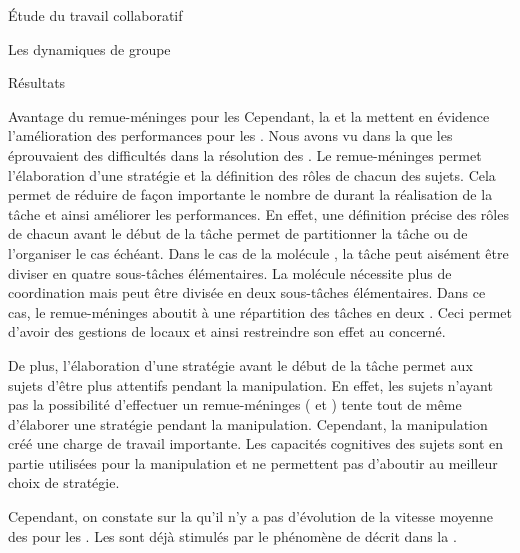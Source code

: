 \documentclass[myfrancais]{mythesis}
\begin{document}
\begin{mypart}{Étude du travail collaboratif}
\begin{mychapter}{Les dynamiques de groupe}
\begin{mysection}{Résultats}
\begin{mysubsection}{Avantage du remue-méninges pour les }
					Cependant, la  et la  mettent en évidence l'amélioration des performances pour les .
					Nous avons vu dans la  que les  éprouvaient des difficultés dans la résolution des .
					Le remue-méninges permet l'élaboration d'une stratégie et la définition des rôles de chacun des sujets.
					Cela permet de réduire de façon importante le nombre de  durant la réalisation de la tâche et ainsi améliorer les performances.
					En effet, une définition précise des rôles de chacun avant le début de la tâche permet de partitionner la tâche ou de l'organiser le cas échéant.
					Dans le cas de la molécule \myPrion, la tâche peut aisément être diviser en quatre sous-tâches élémentaires.
					La molécule \myUbiquitin nécessite plus de coordination mais peut être divisée en deux sous-tâches élémentaires.
					Dans ce cas, le remue-méninges aboutit à une répartition des tâches en deux .
					Ceci permet d'avoir des gestions de  locaux et ainsi restreindre son effet au  concerné.

					De plus, l'élaboration d'une stratégie avant le début de la tâche permet aux sujets d'être plus attentifs pendant la manipulation.
					En effet, les sujets n'ayant pas la possibilité d'effectuer un remue-méninges ( et ) tente tout de même d'élaborer une stratégie pendant la manipulation.
					Cependant, la manipulation créé une charge de travail importante.
					Les capacités cognitives des sujets sont en partie utilisées pour la manipulation et ne permettent pas d'aboutir au meilleur choix de stratégie.

					Cependant, on constate sur la  qu'il n'y a pas d'évolution de la vitesse moyenne des  pour les .
					Les  sont déjà stimulés par le phénomène de  décrit dans la .


\end{mysubsection}
\end{mysection}
\end{mychapter}
\end{mypart}
\end{document}
